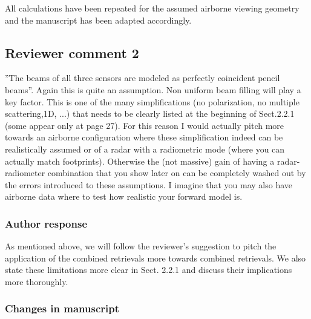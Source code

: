 All calculations have been repeated for the assumed airborne viewing geometry
and the manuscript has been adapted accordingly.

\subsection*{Reviewer comment 2}

 ''The beams of all three sensors are modeled as perfectly coincident pencil
beams''. Again this is quite an assumption. Non uniform beam filling will play a
key factor. This is one of the many simplifications (no polarization, no multiple
scattering,1D, ...) that needs to be clearly listed at the beginning of
Sect.2.2.1 (some appear only at page 27). For this reason I would actually pitch
more towards an airborne configuration where these simplification indeed can
be realistically assumed or of a radar with a radiometric mode (where you can
actually match footprints). Otherwise the (not massive) gain of having a
radar-radiometer combination that you show later on can be completely washed
out by the errors introduced to these assumptions. I imagine that you may also
have airborne data where to test how realistic your forward model is.

\subsubsection*{Author response}


As mentioned above, we will follow the reviewer's suggestion to pitch the
application of the combined retrievals more towards combined retrievals. We also
state these limitations more clear in Sect. 2.2.1 and discuss their implications
more thoroughly.

\subsubsection{Changes in manuscript}

